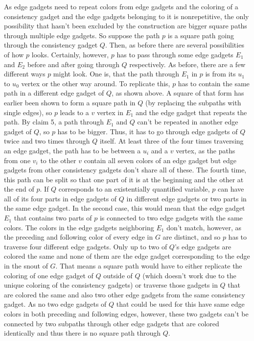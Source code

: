 \documentclass[12pt,a4paper]{article}
\begin{document}
As edge gadgets need to repeat colors from edge gadgets and the coloring of a consistency gadget and the edge gadgets belonging to it is nonrepetitive, the only possibility that hasn't been excluded by the construction are bigger square paths through multiple edge gadgets. So suppose the path $p$ is a square path going through the consistency gadget $Q$. Then, as before there are several possibilities of how $p$ looks. Certainly, however, $p$ has to pass through some edge gadgets $E_1$ and $E_2$ before and after going through $Q$ respectively. 
\newline
As before, there are a few different ways $p$ might look. One is, that the path through $E_1$ in $p$ is from its $u_1$ to $u_0$ vertex or the other way around. To replicate this, $p$ has to contain the same path in a different edge gadget of $Q$, as shown above. A square of that form has earlier been shown to form a square path in $Q$ (by replacing the subpaths with single edges), so $p$ leads to a $v$ vertex in $E_1$ and the edge gadget that repeats the path. By claim 5, a path through $E_1$ and $Q$ can't be repeated in another edge gadget of $Q$, so $p$ has to be bigger. Thus, it has to go through edge gadgets of $Q$ twice and two times through $Q$ itself. At least three of the four times traversing an edge gadget, the path has to be between a $u_i$ and a $v$ vertex, as the paths from one $v_i$ to the other $v$ contain all seven colors of an edge gadget but edge gadgets from other consistency gadgets don't share all of these. The fourth time, this path can be split so that one part of it is at the beginning and the other at the end of $p$.
\newline
If $Q$ corresponds to an existentially quantified variable, $p$ can have all of its four parts in edge gadgets of $Q$ in different edge gadgets or two parts in the same edge gadget. In the second case, this would mean that the edge gadget $E_1$ that contains two parts of $p$ is connected to two edge gadgets with the same colors. The colors in the edge gadgets neighboring $E_1$ don't match, however, as the preceding and following color of every edge in $G$ are distinct, and so $p$ has to traverse four different edge gadgets. Only up to two of $Q$'s edge gadgets are colored the same and none of them are the edge gadget corresponding to the edge in the snout of $G$. That means a square path would have to either replicate the coloring of one edge gadget of $Q$ outside of $Q$ (which doesn't work due to the unique coloring of the consistency gadgets) or traverse those gadgets in $Q$ that are colored the same and also two other edge gadgets from the same consistency gadget. As no two edge gadgets of $Q$ that could be used for this have same edge colors in both preceding and following edges, however, these two gadgets can't be connected by two subpaths through other edge gadgets that are colored identically and thus there is no square path through $Q$.
\end{document}
